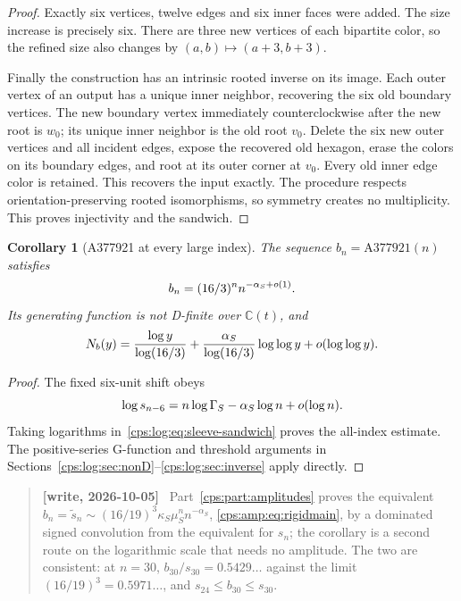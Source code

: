 \documentclass[11pt,letterpaper]{article}
\numberwithin{equation}{section}
\newtheorem{corollary}[theorem]{Corollary}
\theoremstyle{remark}\newtheorem{remark}[theorem]{Remark}
\newenvironment{writenotelog}{\begin{quote}\small\sloppy\textbf{[write, 2026-10-05]}\ }{\end{quote}}
\begin{document}
\begin{proof}
Exactly six vertices, twelve edges and six inner faces were added.
The size increase is precisely six. There are three new vertices
of each bipartite color, so the refined size also changes by
$(a,b)\mapsto(a+3,b+3)$.

Finally the construction has an intrinsic rooted inverse on its
image. Each outer vertex of an output has a unique inner neighbor,
recovering the six old boundary vertices. The new boundary vertex
immediately counterclockwise after the new root is $w_0$; its
unique inner neighbor is the old root $v_0$. Delete the six new
outer vertices and all incident edges, expose the recovered old
hexagon, erase the colors on its boundary edges, and root at its
outer corner at $v_0$. Every old inner edge color is retained.
This recovers the input exactly. The procedure respects
orientation-preserving rooted isomorphisms, so symmetry creates
no multiplicity. This proves injectivity and the sandwich.
\end{proof}

\begin{corollary}[A377921 at every large index]\label{cps:log:cor:921}
The sequence $b_n=\mathrm{A377921}(n)$ satisfies
\begin{equation}\label{cps:log:eq:921alln}
 b_n=(16/3)^n n^{-\alpha_S+o(1)}.
\end{equation}
Its generating function is not D-finite over $\mathbb C(t)$, and
\[
 N_b(y)=\frac{\log y}{\log(16/3)}
       +\frac{\alpha_S}{\log(16/3)}\log\log y+o(\log\log y).
\]
\end{corollary}
\begin{proof}
The fixed six-unit shift obeys
\[
 \log s_{n-6}=n\log\Gamma_S-\alpha_S\log n+o(\log n).
\]
Taking logarithms in~\eqref{cps:log:eq:sleeve-sandwich} proves the all-index
estimate. The positive-series G-function and threshold arguments
in Sections~\ref{cps:log:sec:nonD}--\ref{cps:log:sec:inverse} apply directly.
\end{proof}

\begin{writenotelog}
Part~\ref{cps:part:amplitudes} proves the equivalent
$b_n=\widetilde s_n\sim(16/19)^3\kappa_S\mu_S^nn^{-\alpha_S}$, \eqref{cps:amp:eq:rigidmain}, by a
dominated signed convolution from the equivalent for $s_n$; the corollary is a second route on the
logarithmic scale that needs no amplitude. The two are consistent: at $n=30$,
$b_{30}/s_{30}=0.5429\ldots$ against the limit $(16/19)^3=0.5971\ldots$, and
$s_{24}\le b_{30}\le s_{30}$.
\end{writenotelog}
\end{document}
